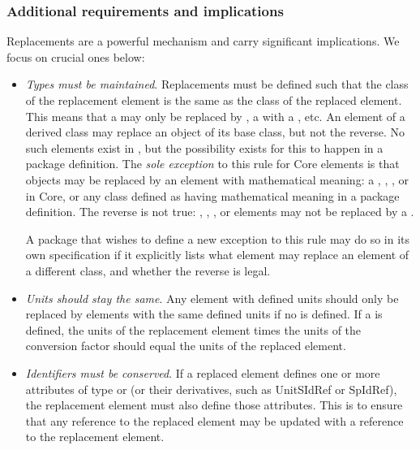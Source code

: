 \subsubsection{Additional requirements and implications}
\label{replacedelement-additional}

Replacements are a powerful mechanism and carry significant
implications.  We focus on crucial ones below:

\begin{itemize}

\item \emph{Types must be maintained}.  Replacements must be defined such
  that the class of the replacement element is the same as the class
  of the replaced element.  This means that a \Species
  may only be replaced by \Species, a \Reaction with a \Reaction, etc.
  An element of a derived class may replace an object of
  its base class, but not the reverse.  No such elements exist in
  \sbmlthreecore, but the possibility exists for this to happen in a package definition.
  The \emph{sole exception} to this rule for Core elements is that \Parameter
  objects may be replaced by an element with mathematical meaning: a
  \Compartment, \Reaction, \Species, or \SpeciesReference in Core, or any
  class defined as having mathematical meaning in a package definition.
  The reverse is not true:  \Compartment, \Reaction, \Species, or
  \SpeciesReference elements may not be replaced by a \Parameter.

  A package that wishes to define a new exception to this rule may do so
  in its own specification if it explicitly lists what element may replace
  an element of a different class, and whether the reverse is legal.

\item \emph{Units should stay the same}.  Any element with defined units
  should only be replaced by elements with the same defined units if no
   is defined.  If a  is
  defined, the units of the replacement element times the units of the
  conversion factor should equal the units of the replaced element.

\item \emph{Identifiers must be conserved}.  If a replaced element
  defines one or more attributes of type  or 
  (or their derivatives, such as UnitSIdRef or SpIdRef),
  the replacement element must also define those attributes.  This is
  to ensure that any reference to the replaced element may be updated
  with a reference to the replacement element.
  

\end{itemize}
